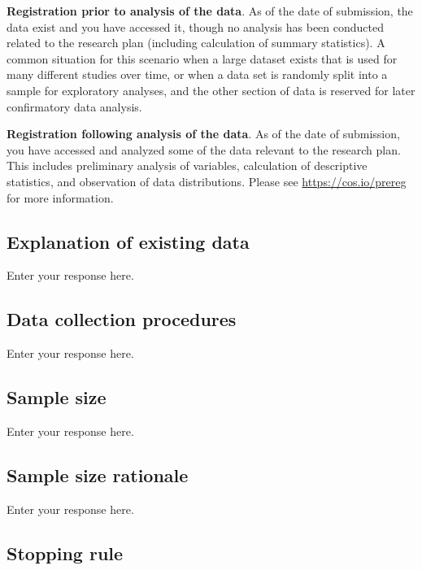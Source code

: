 \documentclass[]{article}
\begin{document}
\textbf{Registration prior to analysis of the data}. As of the date of
submission, the data exist and you have accessed it, though no analysis
has been conducted related to the research plan (including calculation
of summary statistics). A common situation for this scenario when a
large dataset exists that is used for many different studies over time,
or when a data set is randomly split into a sample for exploratory
analyses, and the other section of data is reserved for later
confirmatory data analysis.

\textbf{Registration following analysis of the data}. As of the date of
submission, you have accessed and analyzed some of the data relevant to
the research plan. This includes preliminary analysis of variables,
calculation of descriptive statistics, and observation of data
distributions. Please see \url{https://cos.io/prereg} for more
information.

\hypertarget{explanation-of-existing-data}{%
\subsection{Explanation of existing
data}\label{explanation-of-existing-data}}

Enter your response here.

\hypertarget{data-collection-procedures}{%
\subsection{Data collection
procedures}\label{data-collection-procedures}}

Enter your response here.

\hypertarget{sample-size}{%
\subsection{Sample size}\label{sample-size}}

Enter your response here.

\hypertarget{sample-size-rationale}{%
\subsection{Sample size rationale}\label{sample-size-rationale}}

Enter your response here.

\hypertarget{stopping-rule}{%
\subsection{Stopping rule}\label{stopping-rule}}
\end{document}
